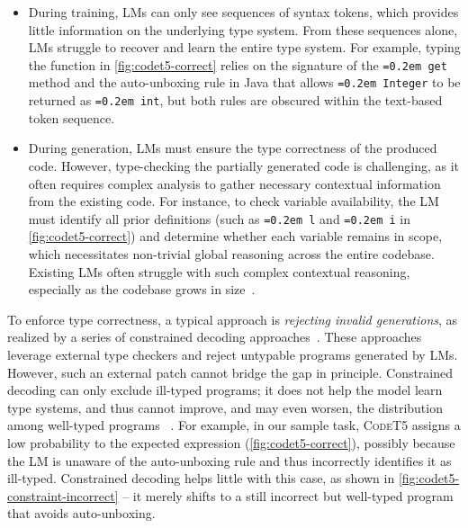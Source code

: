 \documentclass[manuscript,screen]{acmart}
\newcommand{\toolname}[1]{\textsc{#1}}
\newcommand{\tcode}[1]{{\small \texttt{\spaceskip=0.2em #1}}}
\begin{document}
\begin{itemize}
    \item During training, LMs can only see sequences of syntax tokens, which provides little information on the underlying type system. From these sequences alone, LMs struggle to recover and learn the entire type system.
    For example, typing the function in \autoref{fig:codet5-correct} relies on the signature of the \tcode{get} method and the auto-unboxing rule in Java that allows \tcode{Integer} to be returned as \tcode{int}, but both rules are obscured within the text-based token sequence.

    \item During generation, LMs must ensure the type correctness of the produced code. However, type-checking the partially generated code is challenging, as it often requires complex analysis to gather necessary contextual information from the existing code. 
    For instance, to check variable availability, the LM must identify all prior definitions (such as \tcode{l} and \tcode{i} in \autoref{fig:codet5-correct}) and determine whether each variable remains in scope, which necessitates non-trivial global reasoning across the entire codebase. Existing LMs often struggle with such complex contextual reasoning, especially as the codebase grows in size~\cite{guo_2025,DBLP:conf/acl/BaiTZ0WLCX0D0L25}.
\end{itemize}

To enforce type correctness, a typical approach is \emph{rejecting invalid generations}, as realized by a series of {constrained decoding} approaches~\cite{DBLP:conf/sigsoft/0003X023,DBLP:journals/corr/abs-2504-09246}.
These approaches leverage external type checkers and reject untypable programs generated by LMs.
%
However, such an external patch cannot bridge the gap in principle.
%
Constrained decoding can only exclude ill-typed programs; it does not help the model learn type systems, and thus cannot improve, and may even worsen, the distribution among well-typed programs  ~\cite{DBLP:conf/nips/ParkWBPD24}.
%
For example, in our sample task, \toolname{CodeT5} assigns a low probability to the expected expression (\autoref{fig:codet5-correct}), possibly because the LM is unaware of the auto-unboxing rule and thus incorrectly identifies it as ill-typed.
%
Constrained decoding helps little with this case, as shown in \autoref{fig:codet5-constraint-incorrect} -- it merely shifts to a still incorrect but well-typed program that avoids auto-unboxing.
\end{document}
